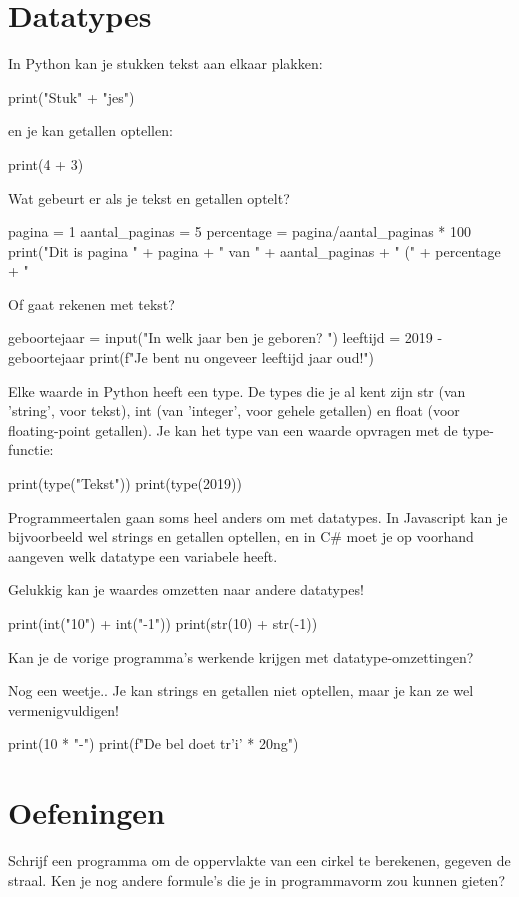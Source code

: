 \documentclass[10pt,a4paper]{article}
\newenvironment{task}{\smallpencil}{}
\begin{document}
\section{Datatypes}
In Python kan je stukken tekst aan elkaar plakken:
\begin{python}
print("Stuk" + "jes")
\end{python}
en je kan getallen optellen:
\begin{python}
print(4 + 3)
\end{python}
Wat gebeurt er als je tekst en getallen optelt?
\begin{python}
pagina = 1
aantal_paginas = 5
percentage = pagina/aantal_paginas * 100
print("Dit is pagina " + pagina + " van " + aantal_paginas + " (" + percentage + "%
\end{python}
Of gaat rekenen met tekst?
\begin{python}
geboortejaar = input("In welk jaar ben je geboren? ")
leeftijd = 2019 - geboortejaar
print(f"Je bent nu ongeveer {leeftijd} jaar oud!")
\end{python}

Elke waarde in Python heeft een type. De types die je al kent zijn str (van 'string', voor tekst), int (van 'integer', voor gehele getallen) en float (voor floating-point getallen). Je kan het type van een waarde opvragen met de type-functie:
\begin{python}
print(type("Tekst"))
print(type(2019))
\end{python}

Programmeertalen gaan soms heel anders om met datatypes. In Javascript kan je bijvoorbeeld wel strings en getallen optellen, en in C\# moet je op voorhand aangeven welk datatype een variabele heeft.

Gelukkig kan je waardes omzetten naar andere datatypes!
\begin{python}
print(int("10") + int("-1"))
print(str(10) + str(-1))
\end{python}

\begin{task}
Kan je de vorige programma's werkende krijgen met datatype-omzettingen?
\end{task}

Nog een weetje.. Je kan strings en getallen niet optellen, maar je kan ze wel vermenigvuldigen!
\begin{python}
print(10 * "-")
print(f"De bel doet tr{'i' * 20}ng")
\end{python}

\section{Oefeningen}
\begin{task}
Schrijf een programma om de oppervlakte van een cirkel te berekenen, gegeven de straal. Ken je nog andere formule's die je in programmavorm zou kunnen gieten?
\end{task}
\end{document}
